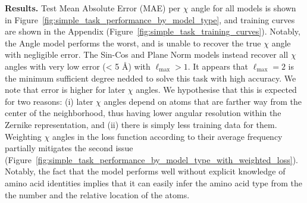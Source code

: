 \textbf{Results.} Test Mean Absolute Error (MAE) per $\chi$ angle for all models is shown in
Figure~\ref{fig:simple_task_performance_by_model_type}, and training curves are shown in the
Appendix (Figure~\ref{fig:simple_task_training_curves}). Notably, the Angle model performs the
worst, and is unable to recover the true $\chi$ angle with negligible error. The Sin-Cos and Plane
Norm models instead recover all $\chi$ angles with very low error (< 5 \AA) with $\ell_{\text{max}}
> 1$. 
 It appears that $\ell_{\text{max}}=2$ is the minimum sufficient degree nedded to solve this task
 with high accuracy. We note that error is higher for later $\chi$ angles. We hypothesise that this
 is expected for two reasons: (i) later $\chi$ angles depend on atoms that are farther way from the
 center of the neighborhood, thus having lower angular resolution within the Zernike
 representation, and (ii) there is simply less training data for them.  Weighting $\chi$ angles in
 the loss function according to their average frequency partially mitigates the second issue
 (Figure~\ref{fig:simple_task_performance_by_model_type_with_weighted_loss}). 
 Notably, the fact that the model performs well without explicit knowledge of amino acid identities
 implies that it can easily infer the amino acid type from the  the number and the relative
 location of the atoms.


